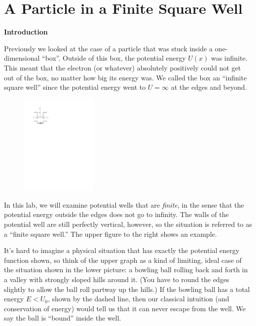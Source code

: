 \section{A Particle in a Finite Square Well}

\makelabheader %

\bigskip

\textbf{Introduction}

Previously we looked at the case of a particle that was stuck inside a one-dimensional ``box''. 
Outside of this box, the potential energy $U(x)$ was infinite. This meant that the electron (or whatever) absolutely positively could not get out of the box, no matter how big its energy was. 
We called the box an ``infinite square well'' since the potential energy went to $U=\infty$ at the edges and beyond.

\begin{figure}
\begin{center}
\vspace{-0.2in}
\includegraphics[width=0.34\textwidth]{particle_in_finite_well/finite_potential.pdf}
\end{center}
\end{figure}

In this lab, we will examine potential wells that are \textit{finite}, in the sense that the potential energy outside the edges does not go to infinity. The walls of the potential well are still perfectly vertical, however, so the situation is referred to as a ``finite square well.'' The upper figure to the right shows an example.

It's hard to imagine a physical situation that has exactly the potential energy function shown, so think of the upper graph as a kind of limiting, ideal case of the situation shown in the lower picture: a bowling ball rolling back and forth in a valley with strongly sloped hills around it.  (You have to round the edges slightly to allow the ball roll partway up the hills.)  If the bowling ball has a total energy $E<U_0$, shown by the dashed line, then our classical intuition (and conservation of energy) would tell us that it can never escape from the well.  We say the ball is ``bound'' inside the well.

